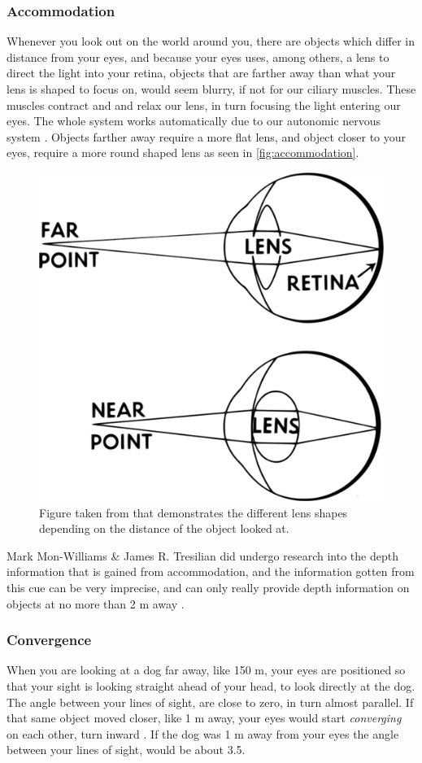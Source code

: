 		\subsubsection{Accommodation}
			Whenever you look out on the world around you, there are objects which differ in distance from your eyes, and because your eyes uses, among others, a lens to direct the light into your retina, objects that are farther away than what your lens is shaped to focus on, would seem blurry, if not for our ciliary muscles. These muscles contract and and relax our lens, in turn focusing the light entering our eyes. The whole system works automatically due to our autonomic nervous system \citep{sensationPerception}. Objects farther away require a more flat lens, and object closer to your eyes, require a more round shaped lens as seen in \autoref{fig:accommodation}.
			\begin{figure}[H]
				\centering
				\includegraphics[width=0.5\linewidth]{figure/accommodation.png}
				\caption{Figure taken from \citep{wikiaccommodation} that demonstrates the different lens shapes depending on the distance of the object looked at.}
				\label{fig:accommodation}
			\end{figure}
			
			Mark Mon-Williams \& James R. Tresilian did undergo research into the depth information that is gained from  accommodation, and the information gotten from this cue can be very imprecise, and can only really provide depth information on objects at no more than 2 m away \citep{accommodation}.
		\subsubsection{Convergence}
			When you are looking at a dog far away, like 150 m, your eyes are positioned so that your sight is looking straight ahead of your head, to look directly at the dog. The angle between your lines of sight, are close to zero\textdegree, in turn almost parallel. If that same object moved closer, like 1 m away, your eyes would start \textit{converging} on each other, turn inward \citep{sensationPerception}. If the dog was 1 m away from your eyes the angle between your lines of sight, would be about 3.5\textdegree\citep{sensationPerception}. 
